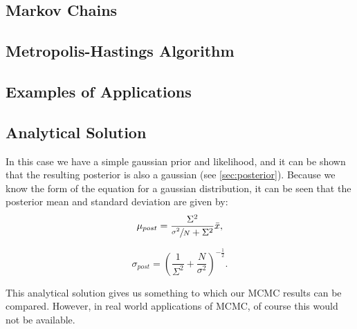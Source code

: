 \documentclass[a4paper,11pt,twoside]{article}
\begin{document}
\subsection{Markov Chains} 
\subsection{Metropolis-Hastings Algorithm}
\subsection{Examples of Applications}
\subsection{Analytical Solution}
In this case we have a simple gaussian prior and likelihood, and it can be shown
that the resulting posterior is also a gaussian (see \cref{sec:posterior}).
Because we know the form of the equation for a gaussian distribution, it can be
seen that the posterior mean and standard deviation are given by:
\begin{equation}
	\mu_{post} = \frac{\Sigma^2}{\sfrac{\sigma^2}{N} + \Sigma^2} \bar{x},
\end{equation}

\begin{equation}
	\sigma_{post} = \left( \frac{1}{\Sigma^2} + \frac{N}{\sigma^2} \right)^{-\frac{1}{2}}.
\end{equation}

This analytical solution gives us something to which our MCMC results can be
compared. However, in real world applications of MCMC, of course this would not
be available.
\end{document}
